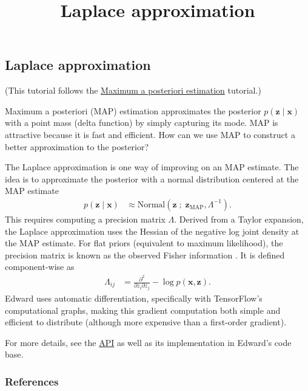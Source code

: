 \title{Laplace approximation}

\subsection{Laplace approximation}

(This tutorial follows the
\href{/tutorials/map}{Maximum a posteriori estimation} tutorial.)

Maximum a posteriori (MAP) estimation approximates the posterior $p(\mathbf{z} \mid \mathbf{x})$
with a point mass (delta function) by simply capturing its mode. MAP is
attractive because it is fast and efficient. How can we use MAP to construct a
better approximation to the posterior?

The Laplace approximation
\citep{laplace1986memoir}
is one way of improving on an MAP estimate. The idea
is to approximate the posterior with a normal distribution centered at the MAP
estimate
\begin{align*}
  p(\mathbf{z} \mid \mathbf{x})
  &\approx
  \text{Normal}(\mathbf{z}\;;\; \mathbf{z}_\text{MAP}, \Lambda^{-1}).
\end{align*}
This requires computing a precision matrix $\Lambda$. Derived from a
Taylor expansion, the Laplace approximation uses the Hessian of the
negative log joint density at the MAP estimate. For flat priors
(equivalent to maximum likelihood), the precision matrix is known
as the observed Fisher information \citep{fisher1925theory}.
It is defined component-wise as
\begin{align*}
  \Lambda_{ij}
  &=
  \frac{\partial^2}{\partial z_i \partial z_j} -\log p(\mathbf{x}, \mathbf{z}).
\end{align*}
Edward uses automatic differentiation, specifically with TensorFlow's
computational graphs, making this gradient computation both simple and
efficient to distribute (although more expensive than a first-order
gradient).

For more details, see the \href{/api/}{API} as well as its
implementation in Edward's code base.

\subsubsection{References}\label{references}
